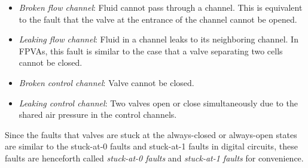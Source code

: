 \documentclass[journal,twoside]{IEEEtran}
\begin{document}
\begin{itemize}

\item \textit{Broken flow channel}: Fluid cannot pass through a channel. This is
equivalent to the fault that the valve at the entrance of the channel cannot be
opened.  

\item \textit{Leaking flow channel}: Fluid in a channel leaks to its
  neighboring channel. In FPVAs, this fault is similar to the case 
  that a valve separating two cells cannot be closed. 


\item \textit{Broken control channel}: Valve cannot be closed.

\item \textit{Leaking control channel}: Two valves open or close simultaneously
  due to the shared air pressure in the control channels.

\end{itemize}
Since the faults that valves are stuck at the always-closed or always-open
states are similar to the stuck-at-0 faults and stuck-at-1 faults in digital
circuits, these faults are henceforth called \textit{stuck-at-0 faults}
and \textit{stuck-at-1 faults} for convenience.
\end{document}
